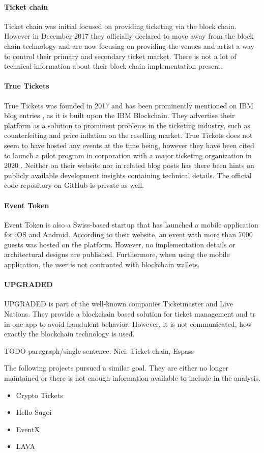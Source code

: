\paragraph{Ticket chain}
Ticket chain\cite{TicketChain} was initial  focused on providing ticketing via the block chain. However in December 2017 they officially declared to move away from the block chain technology and are now focusing on providing the venues and artist a way to control their primary and secondary ticket market. There is not a lot of technical information about their block chain implementation present. 

\paragraph{True Tickets}
True Tickets\cite{truetickets} was founded in 2017 and has been prominently mentioned on IBM blog entries \cite{truetickets-ibm}, as it is built upon the IBM Blockchain. They advertise their platform as a solution to prominent problems in the ticketing industry, such as counterfeiting and price inflation on the reselling market. True Tickets does not seem to have hosted any events at the time being, however they have been cited to launch a pilot program in corporation with a major ticketing organization in 2020 \cite{truetickets-pilot}.
Neither on their website nor in related blog posts has there been hints on publicly available development insights containing technical details. The official code repository on GitHub\cite{github} is private as well.



\paragraph{Event Token}
Event Token is also a Swiss-based startup that has launched a mobile application for iOS and Android. According to their website, an event with more than 7000 guests was hosted on the platform. However, no implementation details or architectural designs are published. Furthermore, when using the mobile application, the user is not confronted with blockchain wallets. 


\paragraph{UPGRADED} UPGRADED is part of the well-known companies Ticketmaster and Live Nations. They provide a blockchain based solution for ticket management and tr in one app to avoid fraudulent behavior. However, it is not communicated, how exactly the blockchain technology is used.

TODO paragraph/single sentence:
Nici: Ticket chain, Espass

The following projects pursued a similar goal. They are either no longer maintained or there is not enough information available to include in the analysis. 
\begin{itemize}
    \item Crypto Tickets
    \item Hello Sugoi
    \item EventX
    \item LAVA
\end{itemize}